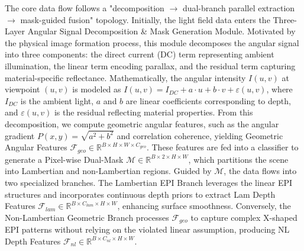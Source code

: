 The core data flow follows a "decomposition $\rightarrow$ dual-branch parallel extraction $\rightarrow$ mask-guided fusion" topology. Initially, the light field data enters the Three-Layer Angular Signal Decomposition \& Mask Generation Module. Motivated by the physical image formation process, this module decomposes the angular signal into three components: the direct current (DC) term representing ambient illumination, the linear term encoding parallax, and the residual term capturing material-specific reflectance. Mathematically, the angular intensity $I(u,v)$ at viewpoint $(u,v)$ is modeled as $I(u,v) = I_{DC} + a \cdot u + b \cdot v + \varepsilon(u,v)$, where $I_{DC}$ is the ambient light, $a$ and $b$ are linear coefficients corresponding to depth, and $\varepsilon(u,v)$ is the residual reflecting material properties. From this decomposition, we compute geometric angular features, such as the angular gradient $P(x,y) = \sqrt{a^2+b^2}$ and correlation coherence, yielding Geometric Angular Features $\mathcal{F}_{geo} \in \mathbb{R}^{B \times H \times W \times C_{geo}}$. These features are fed into a classifier to generate a Pixel-wise Dual-Mask $\mathcal{M} \in \mathbb{R}^{B \times 2 \times H \times W}$, which partitions the scene into Lambertian and non-Lambertian regions. Guided by $\mathcal{M}$, the data flows into two specialized branches. The Lambertian EPI Branch leverages the linear EPI structures and incorporates continuous depth priors to extract Lam Depth Features $\mathcal{F}_{lam} \in \mathbb{R}^{B \times C_{lam} \times H \times W}$, enhancing surface smoothness. Conversely, the Non-Lambertian Geometric Branch processes $\mathcal{F}_{geo}$ to capture complex X-shaped EPI patterns without relying on the violated linear assumption, producing NL Depth Features $\mathcal{F}_{nl} \in \mathbb{R}^{B \times C_{nl} \times H \times W}$.

